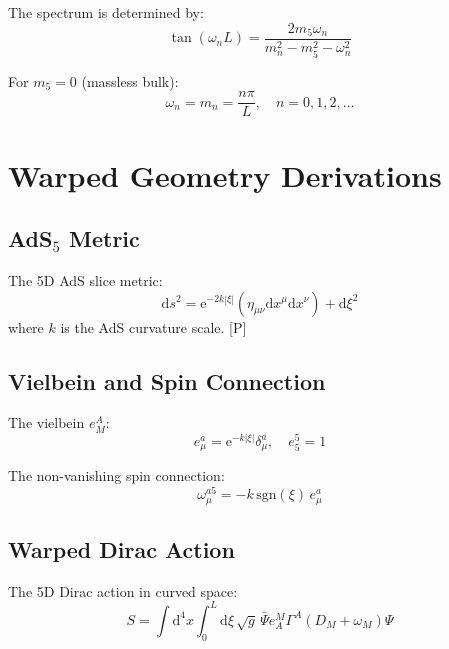 \documentclass[11pt,a4paper]{article}
\newcommand{\dd}{\mathrm{d}}
\newcommand{\ee}{\mathrm{e}}
\begin{document}
The spectrum is determined by:
\begin{equation}
\tan(\omega_n L) = \frac{2m_5\omega_n}{m_n^2 - m_5^2 - \omega_n^2}
\label{eq:fermion-spectrum}
\end{equation}

For $m_5 = 0$ (massless bulk):
\begin{equation}
\omega_n = m_n = \frac{n\pi}{L}, \quad n = 0, 1, 2, \ldots
\label{eq:massless-spectrum}
\end{equation}

\section{Warped Geometry Derivations}
\label{app:warped}

\subsection{AdS$_5$ Metric}

The 5D AdS slice metric:
\begin{equation}
\dd s^2 = \ee^{-2k|\xi|}(\eta_{\mu\nu}\dd x^\mu \dd x^\nu) + \dd\xi^2
\label{eq:ads-metric}
\end{equation}
where $k$ is the AdS curvature scale. [P]

\subsection{Vielbein and Spin Connection}

The vielbein $e_M^A$:
\begin{equation}
e_\mu^a = \ee^{-k|\xi|}\delta_\mu^a, \quad e_5^5 = 1
\label{eq:vielbein}
\end{equation}

The non-vanishing spin connection:
\begin{equation}
\omega_\mu^{a5} = -k\,\text{sgn}(\xi)\, e_\mu^a
\label{eq:spin-connection}
\end{equation}

\subsection{Warped Dirac Action}

The 5D Dirac action in curved space:
\begin{equation}
S = \int \dd^4x\int_0^L \dd\xi\, \sqrt{g}\, \bar{\Psi}e_A^M\Gamma^A(D_M + \omega_M)\Psi
\label{eq:warped-dirac}
\end{equation}
\end{document}

